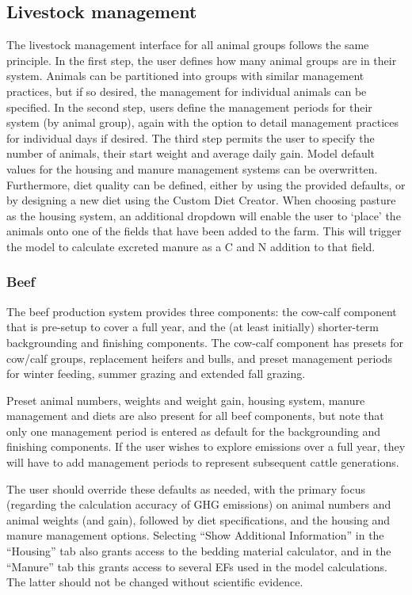 \subsection{Livestock management}
\label{subsec:livestock}

The livestock management interface for all animal groups follows the same
principle. In the first step, the user defines how many animal groups are in
their system. Animals can be partitioned into groups with similar management
practices, but if so desired, the management for individual animals can be
specified. In the second step, users define the management periods for their
system (by animal group), again with the option to detail management practices
for individual days if desired. The third step permits the user to specify the
number of animals, their start weight and average daily gain. Model default
values for the housing and manure management systems can be overwritten.
Furthermore, diet quality can be defined, either by using the provided defaults,
or by designing a new diet using the Custom Diet Creator. When choosing pasture
as the housing system, an additional dropdown will enable the user to `place'
the animals onto one of the fields that have been added to the farm. This will
trigger the model to calculate excreted manure as a C and N addition to that
field.

\subsubsection{Beef}

The beef production system provides three components: the cow-calf component
that is pre-setup to cover a full year, and the (at least initially)
shorter-term backgrounding and finishing components. The cow-calf component has
presets for cow/calf groups, replacement heifers and bulls, and preset
management periods for winter feeding, summer grazing and extended fall grazing.

Preset animal numbers, weights and weight gain, housing system, manure
management and diets are also present for all beef components, but note that
only one management period is entered as default for the backgrounding and
finishing components. If the user wishes to explore emissions over a full year,
they will have to add management periods to represent subsequent cattle
generations.

The user should override these defaults as needed, with the primary focus
(regarding the calculation accuracy of GHG emissions) on animal numbers and
animal weights (and gain), followed by diet specifications, and the housing and
manure management options. Selecting ``Show Additional Information'' in the
``Housing'' tab also grants access to the bedding material calculator, and in
the ``Manure'' tab this grants access to several EFs used in the model
calculations. The latter should not be changed without scientific evidence.

